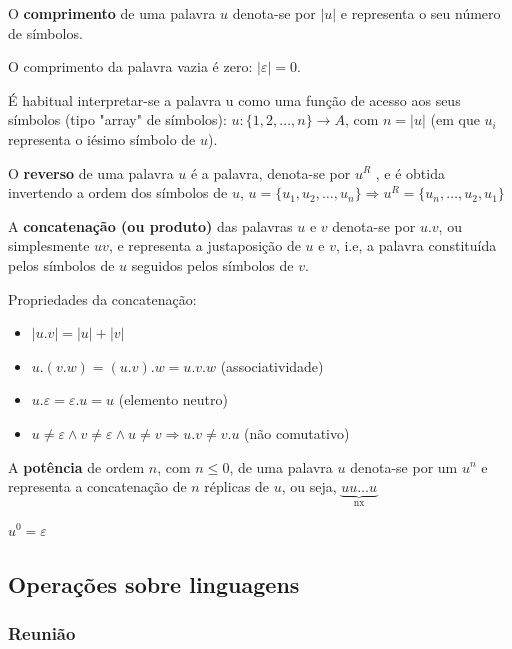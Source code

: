 \documentclass{article}
\begin{document}
\begin{flushleft}
  \item O \textbf{comprimento} de uma palavra $u$ denota-se por $| u |$ e
  representa o seu número de símbolos.
  \item O comprimento da palavra vazia é zero: $|\varepsilon| = 0$.
  \item É habitual interpretar-se a palavra u como uma função de
  acesso aos seus símbolos (tipo "array" de símbolos): $u : \{1,2,\dots,n\} \rightarrow A$, com $n = |u|$
  (em que $u_i$ representa o iésimo símbolo de $u$).
  \item O \textbf{reverso} de uma palavra $u$ é a palavra, denota-se por
  $u^R$ , e é obtida invertendo a ordem dos símbolos de $u$, $u = \{u_1,u_2,\dots,u_n\} \Longrightarrow u^R = \{u_n,\dots,u_2,u_1\}$
  \item A \textbf{concatenação (ou produto)} das palavras $u$ e $v$ denota-se por $u.v$,
  ou simplesmente $uv$, e representa a justaposição de $u$ e $v$, i.e, a palavra constituída pelos
  símbolos de $u$ seguidos pelos símbolos de $v$.
  \item Propriedades da concatenação:
  \begin{itemize}
    \item $|u.v| = |u| + |v|$
    \item $u.(v.w) = (u.v).w = u.v.w$ (associatividade)
    \item $u.\varepsilon = \varepsilon.u = u$ (elemento neutro)
    \item $u \ne \varepsilon \wedge v \ne \varepsilon \wedge u \ne v \Longrightarrow u.v \ne v.u$ (não comutativo)
  \end{itemize}
  \item A \textbf{potência} de ordem $n$, com $n \le 0$, de uma palavra $u$ denota-se
  por um $u^n$ e representa a concatenação de $n$ réplicas de $u$, ou seja, $\underbrace{uu\dots u}_\text{nx}$
  \item $u^0 = \varepsilon$
\end{flushleft}

\subsection{Operações sobre linguagens}

\subsubsection{Reunião}
\end{document}
